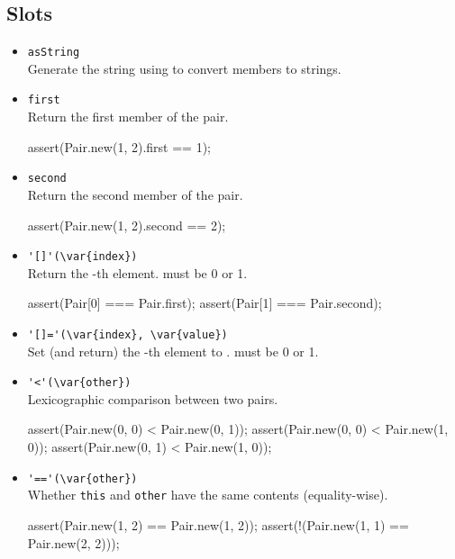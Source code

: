 \subsection{Slots}
\begin{itemize}
\item \lstinline|asString|\\
  Generate the string  using
   to convert members to strings.

\item \lstinline|first|\\
  Return the first member of the pair.
\begin{urbiscript}[firstnumber=last]
assert(Pair.new(1, 2).first == 1);
\end{urbiscript}

\item \lstinline|second|\\
  Return the second member of the pair.
\begin{urbiscript}[firstnumber=last]
assert(Pair.new(1, 2).second == 2);
\end{urbiscript}

\item \lstinline|'[]'(\var{index})|\\
  Return the -th element.   must be 0 or 1.
\begin{urbiscript}[firstnumber=last]
assert(Pair[0] === Pair.first);
assert(Pair[1] === Pair.second);
\end{urbiscript}

\item \lstinline|'[]='(\var{index}, \var{value})|\\
  Set (and return) the -th element to .
   must be 0 or 1.

\item \lstinline|'<'(\var{other})|\\
  Lexicographic comparison between two pairs.
\begin{urbiscript}[firstnumber=last]
assert(Pair.new(0, 0) < Pair.new(0, 1));
assert(Pair.new(0, 0) < Pair.new(1, 0));
assert(Pair.new(0, 1) < Pair.new(1, 0));
\end{urbiscript}

\item \lstinline|'=='(\var{other})|\\
  Whether \lstinline|this| and \lstinline|other| have the same
  contents (equality-wise).
\begin{urbiscript}[firstnumber=last]
assert(Pair.new(1, 2) == Pair.new(1, 2));
assert(!(Pair.new(1, 1) == Pair.new(2, 2)));
\end{urbiscript}
\end{itemize}



